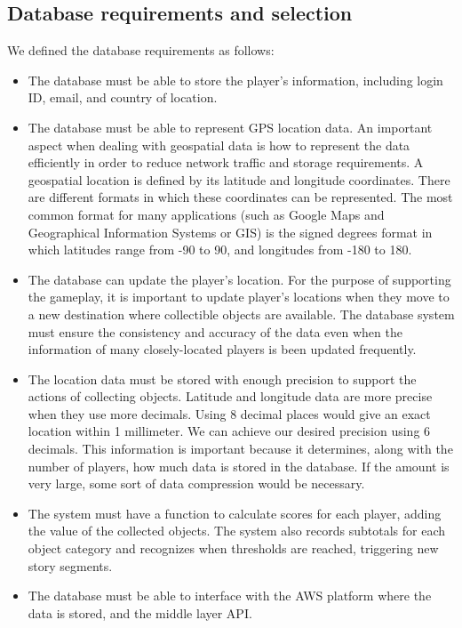 \documentclass[conference]{IEEEtran}
\begin{document}
\subsection{Database requirements and selection}

We defined the database requirements as follows:

\begin{itemize}

\item The database must be able to store the player’s information, including login ID, email, and country of location.
\item The database must be able to represent GPS location data. An important aspect when dealing with geospatial data is how to represent the data efficiently in order to reduce network traffic and storage requirements. A geospatial location is defined by its latitude and longitude coordinates. There are different formats in which these coordinates can be represented. The most common format for many applications (such as Google Maps and Geographical Information Systems or GIS) is the signed degrees format in which latitudes range from -90 to 90, and longitudes from -180 to 180.
\item The database can update the player's location. For the purpose of supporting the gameplay, it is important to update player’s locations when they move to a new destination where collectible objects are available. The database system must ensure the consistency and accuracy of the data even when the information of many closely-located players is been updated frequently. 
\item The location data must be stored with enough precision to support the actions of collecting objects. Latitude and longitude data are more precise when they use more decimals. Using 8 decimal places would give an exact location within 1 millimeter. We can achieve our desired precision using 6 decimals. This information is important because it determines, along with the number of players, how much data is stored in the database. If the amount is very large, some sort of data compression would be necessary.
\item The system must have a function to calculate scores for each player, adding the value of the collected objects. The system also records subtotals for each object category and recognizes when thresholds are reached, triggering new story segments.
\item The database must be able to interface with the AWS platform where the data is stored, and the middle layer API.

\end{itemize}
\end{document}
